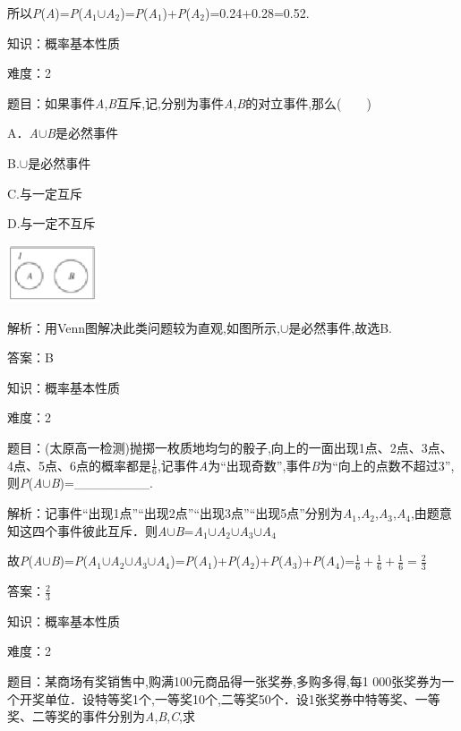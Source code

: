 \documentclass{article} %
\begin{document}
所以\textit{P}(\textit{A})=\textit{P}(\textit{A}${}_{1}$$\mathrm{\cup}$\textit{A}${}_{2}$)=\textit{P}(\textit{A}${}_{1}$)+\textit{P}(\textit{A}${}_{2}$)=0.24+0.28=0.52.

知识：概率基本性质

难度：2

题目：如果事件\textit{A},\textit{B}互斥,记,分别为事件\textit{A},\textit{B}的对立事件,那么(　　)

A．\textit{A}$\mathrm{\cup}$\textit{B}是必然事件

B.$\mathrm{\cup}$是必然事件

C.与一定互斥

D.与一定不互斥

\includegraphics*[width=1.06in, height=0.67in, keepaspectratio=false]{image101}

解析：用Venn图解决此类问题较为直观,如图所示,$\mathrm{\cup}$是必然事件,故选B.

答案：B

知识：概率基本性质

难度：2

题目：(太原高一检测)抛掷一枚质地均匀的骰子,向上的一面出现1点、2点、3点、4点、5点、6点的概率都是$\frac{1}{6}$,记事件\textit{A}为``出现奇数'',事件\textit{B}为``向上的点数不超过3'',则\textit{P}(\textit{A}$\mathrm{\cup}$\textit{B})=\_\_\_\_\_\_\_\_.

解析：记事件``出现1点''``出现2点''``出现3点''``出现5点''分别为\textit{A}${}_{1}$,\textit{A}${}_{2}$,\textit{A}${}_{3}$,\textit{A}${}_{4}$,由题意知这四个事件彼此互斥．则\textit{A}$\mathrm{\cup}$\textit{B}=\textit{A}${}_{1}$$\mathrm{\cup}$\textit{A}${}_{2}$$\mathrm{\cup}$\textit{A}${}_{3}$$\mathrm{\cup}$\textit{A}${}_{4}$

故\textit{P}(\textit{A}$\mathrm{\cup}$\textit{B})=\textit{P}(\textit{A}${}_{1}$$\mathrm{\cup}$\textit{A}${}_{2}$$\mathrm{\cup}$\textit{A}${}_{3}$$\mathrm{\cup}$\textit{A}${}_{4}$)=\textit{P}(\textit{A}${}_{1}$)+\textit{P}(\textit{A}${}_{2}$)+\textit{P}(\textit{A}${}_{3}$)+\textit{P}(\textit{A}${}_{4}$)=$\frac{1}{6}+\frac{1}{6}+\frac{1}{6}=\frac{2}{3}$

答案：$\frac{2}{3}$

知识：概率基本性质

难度：2

题目：某商场有奖销售中,购满100元商品得一张奖券,多购多得,每1 000张奖券为一个开奖单位．设特等奖1个,一等奖10个,二等奖50个．设1张奖券中特等奖、一等奖、二等奖的事件分别为\textit{A},\textit{B},\textit{C},求
\end{document}

